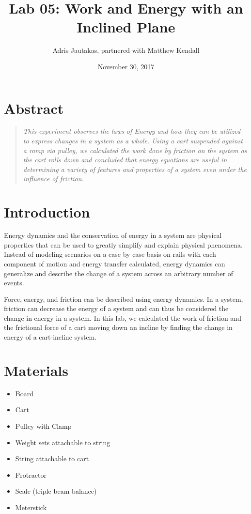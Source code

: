 \documentclass[12pt]{article}
\title{Lab 05: Work and Energy with an Inclined Plane}
\author{Adris Jautakas, partnered with Matthew Kendall}
\date{November 30, 2017}
\begin{document}
    \maketitle
    \pagebreak
    \section*{Abstract}
        \begin{quote}
        {\textit {\small 
            This experiment observes the laws of Energy and how they can be
            utilized to express changes in a system as a whole. Using a cart
            suspended against a ramp via pulley, we calculated the work done
            by friction on the system as the cart rolls down and concluded that
            energy equations are useful in determining a variety of features
            and properties of a system even under the influence of friction.
        } }
        \end{quote}

    \section{Introduction}
        \par Energy dynamics and the conservation of energy in a system are 
        physical properties that can be used to greatly simplify and explain 
        physical phenomena. Instead of modeling scenarios on a case by case 
        basis on rails with each component of motion and energy transfer 
        calculated, energy dynamics can generalize and describe the change of a
        system across an arbitrary number of events.
        \par Force, energy, and friction can be described using energy dynamics.
        In a system, friction can decrease the energy of a system and can thus
        be considered the change in energy in a system. In this lab, we 
        calculated the work of friction and the frictional force of a cart
        moving down an incline by finding the change in energy of a
        cart-incline system.
    \section{Materials}
        \begin{itemize}
            \item Board
            \item Cart
            \item Pulley with Clamp
            \item Weight sets attachable to string
            \item String attachable to cart
            \item Protractor
            \item Scale (triple beam balance)
            \item Meterstick
        \end{itemize}
\end{document}

